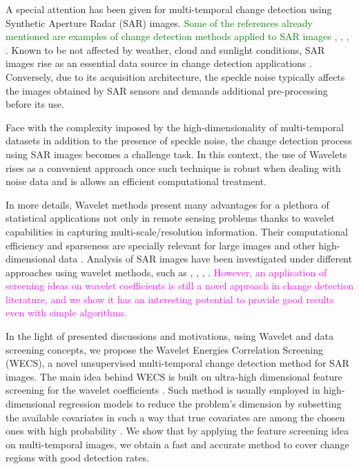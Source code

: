 \documentclass[journal]{IEEEtran}
\begin{document}
A special attention has been given for multi-temporal change detection using Synthetic Aperture Radar (SAR) images. \textcolor{green}{Some of the references already mentioned are examples of change detection methods applied to SAR images \cite{barreto2016deforestation,ban2012multitemporal,scher2021mapping,quin2014mimosa}, \cite{jia2018novel}, \cite{hou2014unsupervised}, \cite{bovolo2005detail} }. 
Known to be not affected by weather, cloud and sunlight conditions, SAR images rise as an essential data source in change detection applications \cite{bovolo2005detail}.
Conversely, due to its acquisition architecture, the speckle noise typically affects the images obtained by SAR sensors and demands additional pre-processing before its use.

Face with the complexity imposed by the high-dimensionality of multi-temporal datasets in addition to the presence of speckle noise, the change detection process using SAR images becomes a challenge task.
In this context, the use of Wavelets rises as a convenient approach once such technique is robust when dealing with noise data and is allows an efficient computational treatment. 

In more details, Wavelet methods present many advantages for a plethora of statistical applications \cite{vidakovic1999statistical} not only in remote sensing problems thanks to wavelet capabilities in capturing multi-scale/resolution information. 
Their computational efficiency and sparseness are specially relevant for large images and other high-dimensional data \cite{morettin2017wavelets}. 
Analysis of SAR images have been investigated under different approaches using wavelet methods, such as \cite{atto2012multidate}, \cite{bouhlel2015multivariate}, \cite{celik2009multiscale}, \cite{cui2012statistical}. 
\textcolor{magenta}{However, an application of screening ideas on wavelet coefficients is still a novel approach in change detection literature, and we show it has an interesting potential to provide good results even with simple algorithms.}


In the light of presented discussions and motivations, using Wavelet and data screening concepts, we propose the Wavelet Energies Correlation Screening (WECS), a novel unsupervised multi-temporal change detection method for SAR images.
%
The main idea behind WECS is built on ultra-high dimensional feature screening for the wavelet coefficients \cite{fan2020statistical}. Such method is usually employed in high-dimensional regression models to reduce the problem's dimension by subsetting the available covariates in such a way that true covariates are among the chosen ones with high probability \cite{fan2008sure}. We show that by applying the feature screening idea on multi-temporal images, we obtain a fast and accurate method to cover change regions with good detection rates.
\end{document}
